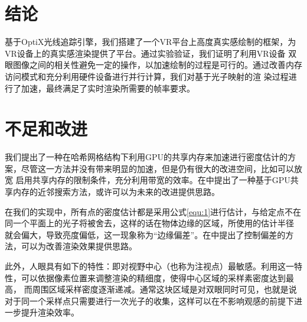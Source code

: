 \documentclass[UTF8]{ctexart}
\begin{document}
\section{结论}
    基于OptiX光线追踪引擎，我们搭建了一个VR平台上高度真实感绘制的框架，为VR设备上的真实感渲染提供了平台。通过实验验证，我们证明了利用VR设备
    双眼图像之间的相关性避免一定的操作，以加速绘制的过程是可行的。通过改善内存访问模式和充分利用硬件设备进行并行计算，我们对基于光子映射的渲
    染过程进行了加速，最终满足了实时渲染所需要的帧率要求。

\section{不足和改进}
    我们提出了一种在哈希网格结构下利用GPU的共享内存来加速进行密度估计的方案，尽管这一方法并没有带来明显的加速，但是仍有很大的改进空间，比如可以放宽
    启用共享内存的限制条件，充分利用带宽的效率。在\cite{gross2019fast}中提出了一种基于GPU共享内存的近邻搜索方法，或许可以为未来的改进提供思路。

    在我们的实现中，所有点的密度估计都是采用公式\ref{equ:1}进行估计，与给定点不在同一个平面上的光子将被舍去，这样的话在物体边缘的区域，所使用的估计半径
    就会偏大，导致亮度偏低，这一现象称为“边缘偏差”。在\cite{biasControl}中提出了控制偏差的方法，可以为改善渲染效果提供思路。

    此外，人眼具有如下的特性：即对视野中心（也称为注视点\cite{Guenter2012Foveated}）最敏感。利用这一特性，可以依据像素位置来调整渲染的精细度，使得中心区域的采样素密度达到最高，
    而周围区域采样密度逐渐递减。通常这块区域是对双眼同时可见，也就是说对于同一个采样点只需要进行一次光子的收集，这样可以在不影响观感的前提下进一步提升渲染效率。

\end{document}
